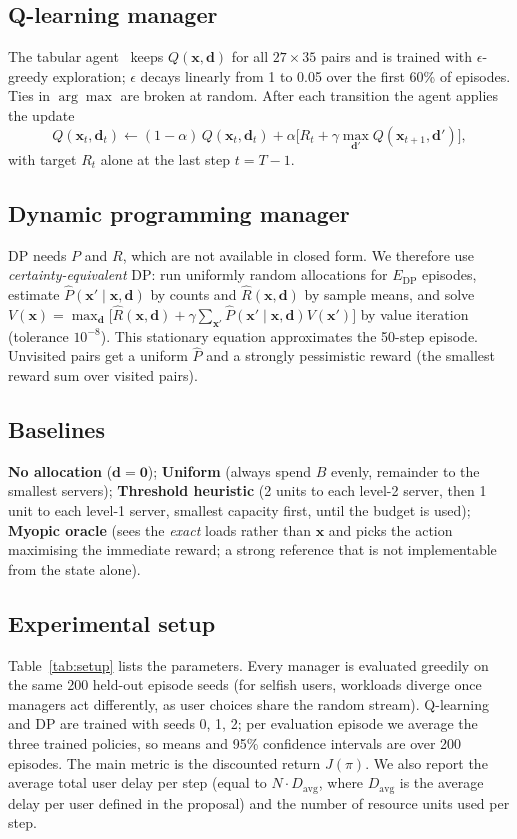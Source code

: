 \documentclass{article}
\begin{document}
\subsection{Q-learning manager}
The tabular agent~\cite{watkins1992} keeps $Q(\bm x,\bm d)$ for all $27\times35$ pairs
and is trained with $\epsilon$-greedy exploration; $\epsilon$
decays linearly from 1 to 0.05 over the first 60\% of episodes. Ties in $\arg\max$ are
broken at random.
After each transition the agent applies the update
\[
Q(\bm x_t,\bm d_t)\leftarrow(1-\alpha)\,Q(\bm x_t,\bm d_t)+\alpha\big[R_t+\gamma\max_{\bm d'}Q(\bm x_{t+1},\bm d')\big],
\]
with target $R_t$ alone at the last step $t=T-1$.

\subsection{Dynamic programming manager}
DP needs $P$ and $R$, which are not available in closed form. We therefore use
\emph{certainty-equivalent} DP: run uniformly random allocations for $E_{\text{DP}}$
episodes, estimate $\hat P(\bm x'\mid\bm x,\bm d)$ by counts and $\hat R(\bm x,\bm d)$ by
sample means, and solve
$V(\bm x)=\max_{\bm d}\big[\hat R(\bm x,\bm d)+\gamma\sum_{\bm x'}\hat P(\bm x'\mid\bm x,\bm d)V(\bm x')\big]$
by value iteration~\cite{puterman1994} (tolerance $10^{-8}$). This stationary equation approximates
the 50-step episode. Unvisited pairs get a uniform $\hat P$ and a strongly pessimistic
reward (the smallest reward sum over visited pairs).

\subsection{Baselines}
\textbf{No allocation} ($\bm d=\bm 0$);
\textbf{Uniform} (always spend $B$ evenly, remainder to the smallest servers);
\textbf{Threshold heuristic} (2 units to each level-2 server, then 1 unit to each level-1
server, smallest capacity first, until the budget is used);
\textbf{Myopic oracle} (sees the \emph{exact} loads rather than $\bm x$ and picks the action
maximising the immediate reward; a strong reference that is not implementable from the
state alone).

\subsection{Experimental setup}
Table~\ref{tab:setup} lists the parameters. Every manager is evaluated greedily on the
same 200 held-out episode seeds (for selfish users, workloads diverge once managers act
differently, as user choices share the random stream). Q-learning and DP are trained with
seeds 0, 1, 2; per evaluation episode we average the three trained policies, so means and
95\% confidence intervals are over 200 episodes. The main metric is the discounted return
$J(\pi)$. We also report the average total user delay per step (equal to $N\cdot D_{\mathrm{avg}}$,
where $D_{\mathrm{avg}}$ is the average delay per user defined in the proposal) and the
number of resource units used per step.
\end{document}

